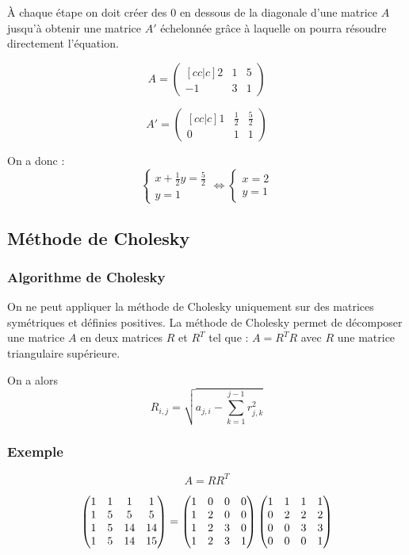 \documentclass{article}
\begin{document}
À chaque étape on doit créer des $0$ en dessous de la diagonale d'une matrice $A$ jusqu'à obtenir une matrice $A'$ échelonnée grâce à laquelle on pourra résoudre directement l'équation.

\[ A =
 \begin{pmatrix}[cc|c]
  2  & 1 & 5 \\
  -1 & 3 & 1
 \end{pmatrix}\]

\[ A' =
 \begin{pmatrix}[cc|c]
  1 & \frac{1}{2} & \frac{5}{2} \\
  0 & 1           & 1
 \end{pmatrix}\]

On a donc :
\[\begin{cases}
  x + \frac{1}{2}y = \frac{5}{2} \\
  y = 1
 \end{cases}
 \iff
 \begin{cases}
  x = 2 \\
  y = 1
 \end{cases}
\]


\subsection{Méthode de Cholesky}

\subsubsection{Algorithme de Cholesky}

On ne peut appliquer la méthode de Cholesky uniquement sur des matrices symétriques et définies positives.
La méthode de Cholesky permet de décomposer une matrice $A$ en deux matrices $R$ et $R^T$ tel que : $A = R^T R$
avec $R$ une matrice triangulaire supérieure.

On a alors \[R_{i, j} = \sqrt{a_{j, i} - \sum_{k=1}^{j-1} r^2_{j,k}}\]

\subsubsection{Exemple}

\[ A = R R^T\]

\[\begin{pmatrix}
1 & 1 & 1  & 1 \cr
1 & 5 & 5  & 5 \cr
1 & 5 & 14 & 14 \cr
1 & 5 & 14 & 15
\end{pmatrix}
=
\begin{pmatrix}
1 & 0 & 0  & 0 \cr
1 & 2 & 0  & 0 \cr
1 & 2 & 3  & 0 \cr
1 & 2 & 3  & 1
\end{pmatrix}
\begin{pmatrix}
1 & 1 & 1  & 1 \cr
0 & 2 & 2  & 2 \cr
0 & 0 & 3  & 3 \cr
0 & 0 & 0  & 1
\end{pmatrix}\]
\end{document}
